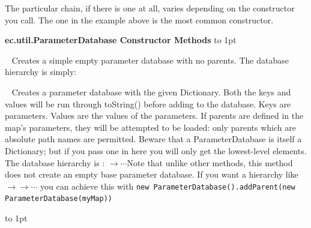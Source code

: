 \documentclass[twoside,10pt]{book}
\newcommand\method[1]{\index{#1}\textsf{#1}}
\newcommand*{\xfill}[1][0pt]{%
	\cleaders
		\hbox to 1pt{\hss
			\raisebox{#1}{\rule{1.2pt}{0.4pt}}%
			\hss}\hfill}
\newenvironment{methods}[1]{
\vspace{1.0em}\noindent\textsf{\textbf{#1 Methods}}\quad \xfill[0.5ex]
\vspace{-0.25em}
\begin{description}
\small}
{\end{description}\vspace{-0.5em}\rule{0pt}{0pt}\xfill[0ex]\vspace{1em}}
\newcommand{\mthd}[1]{\item[{\sf #1}]~\newline}
\begin{document}
The particular chain, if there is one at all, varies depending on the constructor you call.  The one in the example above is the most common constructor.

\begin{methods}{ec.util.ParameterDatabase Constructor}
\mthd{public ParameterDatabase()}
Creates a simple empty parameter database with no parents.  The database hierarchy is simply: 
\mthd{public ParameterDatabase(Dictionary map)}
Creates a parameter database with the given Dictionary. Both the keys and values will be run through \method{toString()} before adding to the database. Keys are parameters. Values are the values of the parameters. If parents are defined in the map's parameters, they will be attempted to be loaded: only parents which are absolute path names are permitted.  Beware that a ParameterDatabase is itself a Dictionary; but if you pass one in here you will only get the lowest-level elements.    The database hierarchy is : \(\rightarrow\cdots\)\quad Note that unlike other methods, this method does not create an empty base parameter database.  If you want a hierarchy like \(\rightarrow\)\(\rightarrow\cdots\) you can achieve this with {\tt new ParameterDatabase().addParent(new ParameterDatabase(myMap))}


\end{methods}
\end{document}
